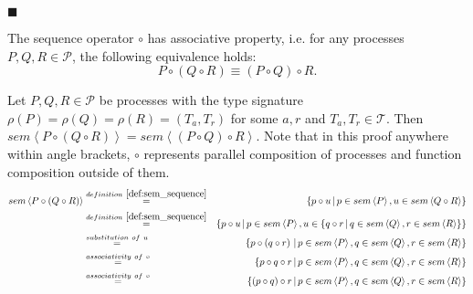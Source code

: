 \begin{myproof}
\hfill$\blacksquare$
\end{myproof}

\begin{theorem}
\label{thm:associativity_sequence}
The sequence operator $\circ$ has associative property, i.e. for any processes $P, Q, R \in \mathcal{P}$, the following equivalence holds:
\begin{equation*}
  P \circ \left( Q \circ R \right) \equiv \left( P \circ Q \right) \circ R.
\end{equation*}
\end{theorem}

\begin{myproof}
Let $P, Q, R \in \mathcal{P}$ be processes with the type signature $\rho \left( P \right) = \rho \left( Q \right) = \rho \left( R \right) = \left( T_a, T_r \right)$ for some $a, r$ and $T_a, T_r \in \mathcal{T}$. Then $sem \left\langle P \circ \left( Q \circ R \right) \right\rangle = sem \left\langle \left( P \circ Q \right) \circ R \right\rangle$. Note that in this proof anywhere within angle brackets, $\circ$ represents parallel composition of processes and function composition outside of them.
\begin{eqnarray*}
  sem \left\langle P \circ \left( Q \circ R \right) \right\rangle & \overset{\defref{def:sem_sequence}}{=} & \left\{ p \circ u \,|\, p \in sem \left\langle P \right\rangle, u \in sem \left\langle Q \circ R \right\rangle \right\} \\
  & \overset{\defref{def:sem_sequence}}{=} & \left\{ p \circ u \,|\, p \in sem \left\langle P \right\rangle, u \in \left\{q \circ r \,|\, q \in sem \left\langle Q \right\rangle, r \in sem \left\langle R \right\rangle \right\} \right\} \\
  & \overset{substitution \ of \ u}{=} & \left\{ p \circ \left( q \circ r \right) \,|\, p \in sem \left\langle P \right\rangle, q \in sem \left\langle Q \right\rangle, r \in sem \left\langle R \right\rangle \right\} \\
  & \overset{associativity \ of \  \circ}{=} & \left\{ p \circ q \circ r \,|\, p \in sem \left\langle P \right\rangle, q \in sem \left\langle Q \right\rangle, r \in sem \left\langle R \right\rangle \right\} \\
  & \overset{associativity \ of \  \circ}{=} & \left\{ \left( p \circ q \right) \circ r \,|\, p \in sem \left\langle P \right\rangle, q \in sem \left\langle Q \right\rangle, r \in sem \left\langle R \right\rangle \right\} \\

\end{eqnarray*}
\end{myproof}
